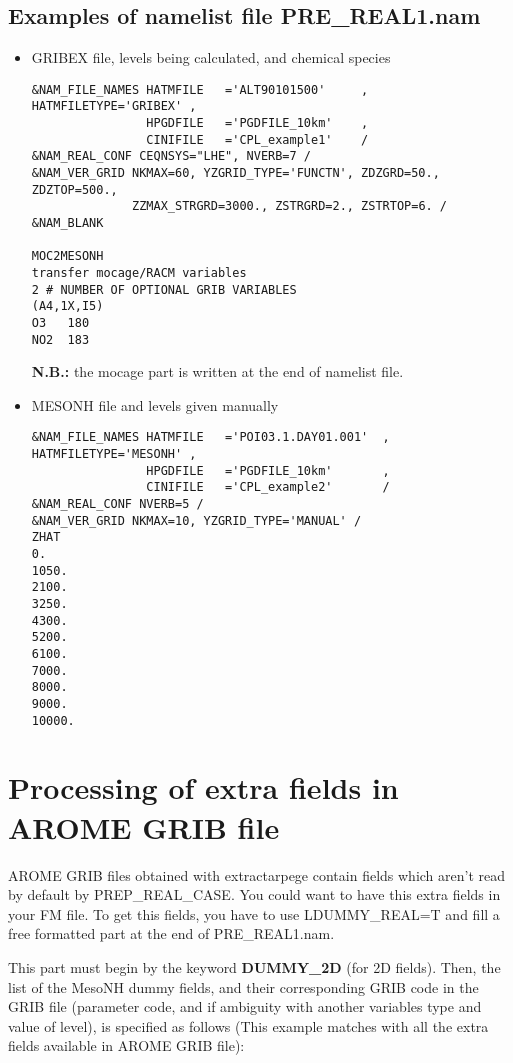 \subsection{Examples of namelist file PRE\_REAL1.nam}
\begin{itemize}
\item GRIBEX file, levels being calculated, and chemical species
\begin{verbatim}
&NAM_FILE_NAMES HATMFILE   ='ALT90101500'     , HATMFILETYPE='GRIBEX' ,
                HPGDFILE   ='PGDFILE_10km'    ,
                CINIFILE   ='CPL_example1'    /
&NAM_REAL_CONF CEQNSYS="LHE", NVERB=7 /
&NAM_VER_GRID NKMAX=60, YZGRID_TYPE='FUNCTN', ZDZGRD=50., ZDZTOP=500., 
              ZZMAX_STRGRD=3000., ZSTRGRD=2., ZSTRTOP=6. /
&NAM_BLANK
              
MOC2MESONH
transfer mocage/RACM variables 
2 # NUMBER OF OPTIONAL GRIB VARIABLES
(A4,1X,I5)
O3   180
NO2  183
\end{verbatim}
{\bf N.B.:} the mocage part is written at the end of namelist file.
\subitem

\item MESONH file and levels given manually
\begin{verbatim}
&NAM_FILE_NAMES HATMFILE   ='POI03.1.DAY01.001'  , HATMFILETYPE='MESONH' ,
                HPGDFILE   ='PGDFILE_10km'       ,
                CINIFILE   ='CPL_example2'       /
&NAM_REAL_CONF NVERB=5 /
&NAM_VER_GRID NKMAX=10, YZGRID_TYPE='MANUAL' /
ZHAT
0.
1050.
2100.
3250.
4300.
5200.
6100.
7000.
8000.
9000.
10000.
\end{verbatim}
\end{itemize}


\section{Processing of extra fields in AROME GRIB file}
\label{i:realdummy}

AROME GRIB files obtained with extractarpege contain fields which aren't read by default by PREP\_REAL\_CASE. You could want to have this extra fields in your FM file. To get this fields, you have to use LDUMMY\_REAL=T and fill a free formatted part at the end of PRE\_REAL1.nam.

This part must begin by the keyword {\bf DUMMY\_2D} (for 2D fields).
Then, the list of the MesoNH dummy fields, and their corresponding GRIB code in the GRIB file (parameter code, and if 
ambiguity with another variables type and value of level),
 is specified as follows (This example  matches with all the extra fields available in AROME GRIB file): 

